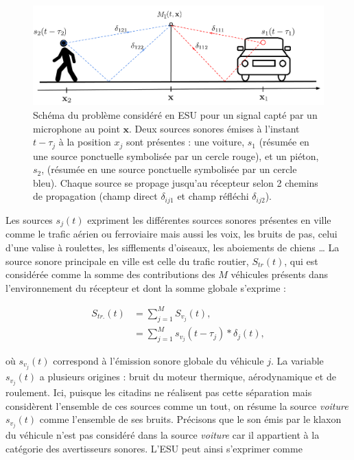\begin{figure}[hbtp]
\centering
\includegraphics[width=.9\linewidth]{./figures/autres/schema_ville_propa.pdf}
\caption{Schéma du problème considéré en ESU pour un signal capté par un microphone au point $\mathbf{x}$. Deux sources sonores émises à l'instant $t-\tau_{j}$ à la position $x_j$ sont présentes : une voiture, $s_{1}$ (résumée en une source ponctuelle symbolisée par un cercle rouge), et un piéton, $s_2$, (résumée en une source ponctuelle symbolisée par un cercle bleu). Chaque source se propage jusqu'au récepteur selon 2 chemins de propagation (champ direct $\delta_{ij1}$ et champ réfléchi $\delta_{ij2}$).}
\label{fig:schema_ville}
\end{figure}

Les sources $s_j(t)$ expriment les différentes sources sonores présentes en ville comme le trafic aérien ou ferroviaire mais aussi les voix, les bruits de pas, celui d'une valise à roulettes, les sifflements d'oiseaux, les aboiements de chiens \dots{} La source sonore principale en ville est celle du trafic routier, $S_{tr}(t)$, qui est considérée comme la somme des contributions des $M$ véhicules présents dans l'environnement du récepteur et dont la somme globale s'exprime :

\begin{subequations}
\begin{align}
S_{tr.}(t) &= \sum_{j = 1}^M S_{v_j}(t),\\
 & = \sum_{j = 1}^M s_{v_j}(t-\tau_j) \ast \delta_{j}(t),
\end{align}
\end{subequations}

où $s_{v_j}(t)$ correspond à l'émission sonore globale du véhicule $j$. La variable $s_{v_j}(t)$ a plusieurs origines : bruit du moteur thermique, aérodynamique et de roulement. Ici, puisque les citadins ne réalisent pas cette séparation mais considèrent l'ensemble de ces sources comme un tout, on résume la source \textit{voiture} $s_{v_j}(t)$ comme l'ensemble de ses bruits. Précisons que le son émis par le klaxon du véhicule n'est pas considéré dans la source \textit{voiture} car il appartient à la catégorie des avertisseurs sonores.
L'ESU peut ainsi s'exprimer comme


